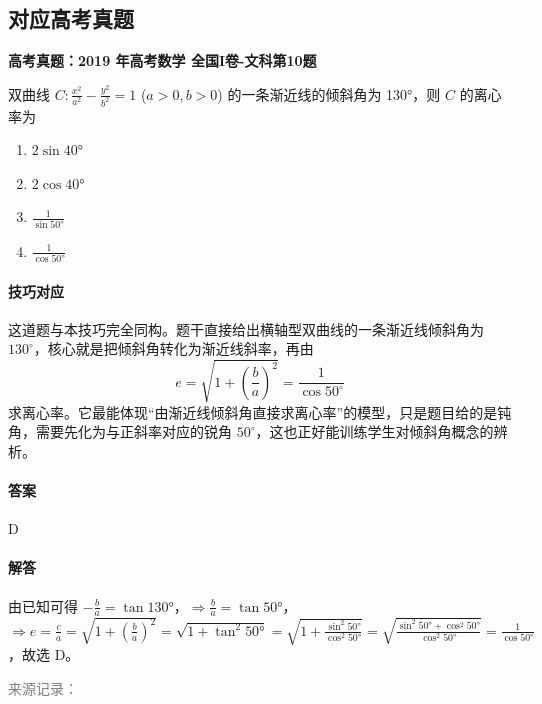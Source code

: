 \documentclass[UTF8,a4paper,11pt]{ctexart}
\newenvironment{gaokao}[1]{\par\medskip\noindent\textbf{高考真题：#1}\par\smallskip}{\par\medskip}
\begin{document}
\subsection*{对应高考真题}

\begin{gaokao}{2019 年高考数学 全国I卷-文科第10题}

双曲线 $C: \frac{x^2}{a^2} - \frac{y^2}{b^2} = 1$ ($a>0,b>0$) 的一条渐近线的倾斜角为 130°，则 $C$ 的离心率为

\begin{enumerate}[label=\Alph*. ,itemsep=2pt]

\item $2\sin40°$

\item $2\cos40°$

\item $\frac{1}{\sin50°}$

\item $\frac{1}{\cos50°}$

\end{enumerate}

\paragraph{技巧对应}

这道题与本技巧完全同构。题干直接给出横轴型双曲线的一条渐近线倾斜角为 $130^\circ$，核心就是把倾斜角转化为渐近线斜率，再由
\[
e=\sqrt{1+\left(\frac{b}{a}\right)^2}=\frac{1}{\cos 50^\circ}
\]
求离心率。它最能体现“由渐近线倾斜角直接求离心率”的模型，只是题目给的是钝角，需要先化为与正斜率对应的锐角 $50^\circ$，这也正好能训练学生对倾斜角概念的辨析。

\paragraph{答案}

D

\paragraph{解答}

由已知可得 $-\frac{b}{a} = \tan130°$，$\Rightarrow \frac{b}{a} = \tan50°$，$\Rightarrow e = \frac{c}{a} = \sqrt{1+\left(\frac{b}{a}\right)^2} = \sqrt{1+\tan^2 50°} = \sqrt{1+\frac{\sin^2 50°}{\cos^2 50°}} = \sqrt{\frac{\sin^2 50°+\cos^2 50°}{\cos^2 50°}} = \frac{1}{\cos50°}$，故选 D。

\par\smallskip\textcolor{gray}{\footnotesize 来源记录：\texttt{}}

\end{gaokao}
\end{document}
